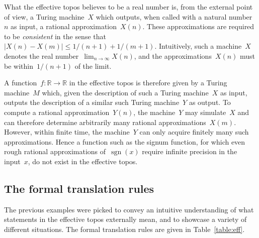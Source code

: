 \documentclass[oneside]{amsart}
\theoremstyle{definition}
\theoremstyle{plain}
\theoremstyle{remark}
\newcommand{\RR}{\mathbb{R}}
\renewcommand{\_}{\mathpunct{.}\,}
\newcommand{\effective}{ef{}fective\xspace}
\newcommand{\?}{\,{:}\,}
\begin{document}
What the \effective topos believes to be a real number is, from the external
point of view, a Turing machine~$X$ which outputs, when called with a natural
number~$n$ as input, a rational approximation~$X(n)$. These approximations are
required to be \emph{consistent} in the sense that~$|X(n) - X(m)|
\leq 1/(n+1) + 1/(m+1)$. Intuitively, such a machine~$X$ denotes the real
number~$\lim_{n \to \infty} X(n)$, and the approximations~$X(n)$ must be
within~$1/(n+1)$ of the limit.

A function~$f : \RR \to \RR$ in the \effective topos is therefore given by a
Turing machine~$M$ which, given the description of such a Turing machine~$X$ as
input, outputs the description of a similar such Turing machine~$Y$ as output.
To compute a rational approximation~$Y(n)$, the machine~$Y$ may simulate~$X$
and can therefore determine arbitrarily many rational approximations~$X(m)$.
However, within finite time, the machine~$Y$ can only acquire finitely many
such approximations. Hence a function such as the signum function, for which
even rough rational approximations of~$\operatorname{sgn}(x)$ require infinite
precision in the input~$x$, do not exist in the \effective topos.


\subsection{The formal translation rules} The previous examples were picked to
convey an intuitive understanding of what statements in the \effective topos
externally mean, and to showcase a variety of different situations. The
formal translation rules are given in Table~\ref{table:eff}.
\end{document}
